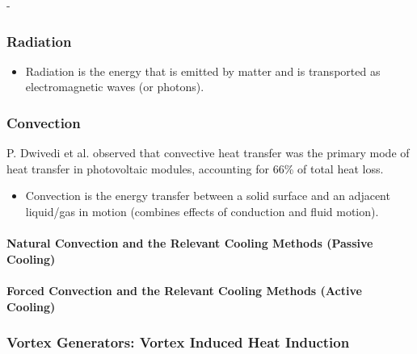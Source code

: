 \noindent - \par

\subsubsection{Radiation} %
\begin{itemize}
    \item Radiation is the energy that is emitted by matter and is transported as electromagnetic waves (or photons).
\end{itemize}

\subsubsection{Convection} %
\noindent P. Dwivedi et al. observed that convective heat transfer was the primary mode of heat transfer in photovoltaic modules, accounting for 66\% of total heat loss.
\begin{itemize}
    \item Convection is the energy transfer between a solid surface and an adjacent liquid/gas in motion (combines effects of conduction and fluid motion).
\end{itemize}

\paragraph{Natural Convection and the Relevant Cooling Methods (Passive Cooling)} %
\paragraph{Forced Convection and the Relevant Cooling Methods (Active Cooling)} %
\subsubsection{Vortex Generators: Vortex Induced Heat Induction} %


